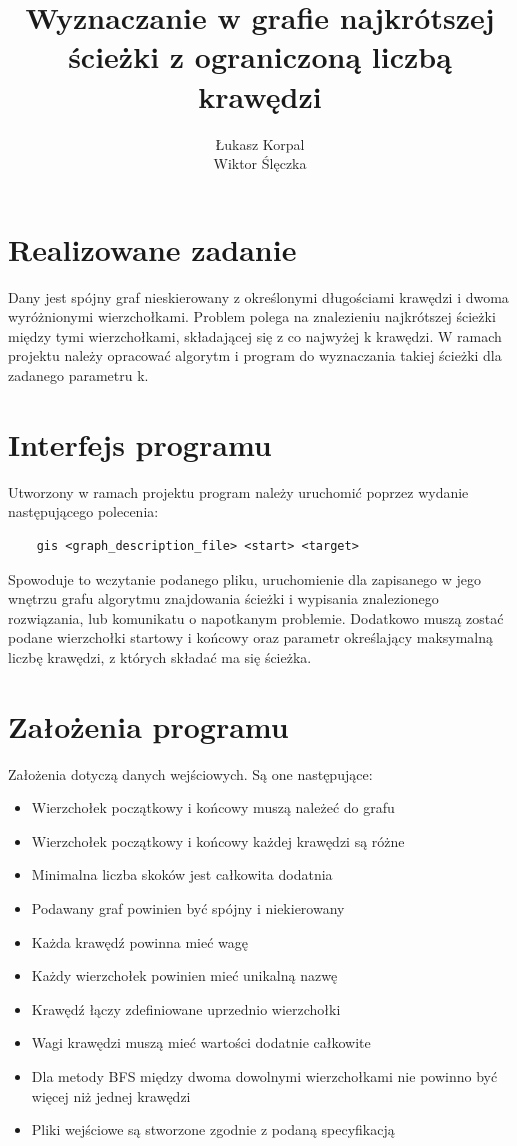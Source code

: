 \documentclass[a4paper, 12pt]{article}
\author{Łukasz Korpal \\ Wiktor Ślęczka}
\title{Wyznaczanie w grafie najkrótszej ścieżki z ograniczoną liczbą krawędzi}
\begin{document}
	\sloppy
	\maketitle
	\newpage
	\tableofcontents
	\newpage
	\section{Realizowane zadanie}
	Dany jest spójny graf nieskierowany z określonymi długościami krawędzi i dwoma wyróżnionymi wierzchołkami. Problem polega na znalezieniu najkrótszej ścieżki między tymi wierzchołkami, składającej się z co najwyżej k krawędzi. W ramach projektu należy opracować algorytm i program do wyznaczania takiej ścieżki dla zadanego parametru k.
	
	\section{Interfejs programu}
	Utworzony w ramach projektu program należy uruchomić poprzez wydanie następującego polecenia:
	\begin{verbatim}
	gis <graph_description_file> <start> <target>
	\end{verbatim}
	Spowoduje to wczytanie podanego pliku, uruchomienie dla zapisanego w jego wnętrzu grafu algorytmu znajdowania ścieżki i wypisania znalezionego rozwiązania, lub komunikatu o napotkanym problemie. Dodatkowo muszą zostać podane wierzchołki startowy i końcowy oraz parametr określający maksymalną liczbę krawędzi, z których składać ma się ścieżka.
	\section{Założenia programu}
	Założenia dotyczą danych wejściowych. Są one następujące:
	\begin{itemize}
		\item Wierzchołek początkowy i końcowy muszą należeć do grafu
		\item Wierzchołek początkowy i końcowy każdej krawędzi są różne
		\item Minimalna liczba skoków jest całkowita dodatnia
		\item Podawany graf powinien być spójny i niekierowany
		\item Każda krawędź powinna mieć wagę
		\item Każdy wierzchołek powinien mieć unikalną nazwę
		\item Krawędź łączy zdefiniowane uprzednio wierzchołki
		\item Wagi krawędzi muszą mieć wartości dodatnie całkowite
		\item Dla metody BFS między dwoma dowolnymi wierzchołkami nie powinno być więcej niż jednej krawędzi
		\item Pliki wejściowe są stworzone zgodnie z podaną specyfikacją
	\end{itemize}
	
\end{document}
